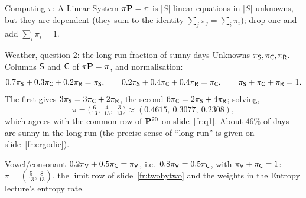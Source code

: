 \begin{frame}{Computing $\pi$: A Linear System}
  \label{fr:statcompute}
  \small
  $\pi\mathbf{P}=\pi$ is $|S|$ linear equations in $|S|$ unknowns, but they are dependent (they sum to the identity $\sum_j\pi_j=\sum_i\pi_i$); drop one and add $\sum_i\pi_i=1$.
  \begin{exampleblock}{Weather, question 2: the long-run fraction of sunny days}
    Unknowns $\pi_{\mathsf{S}},\pi_{\mathsf{C}},\pi_{\mathsf{R}}$. Columns $\mathsf{S}$ and $\mathsf{C}$ of $\pi\mathbf{P}=\pi$, and normalisation:
    \[
      0.7\pi_{\mathsf{S}}+0.3\pi_{\mathsf{C}}+0.2\pi_{\mathsf{R}}=\pi_{\mathsf{S}},\qquad
      0.2\pi_{\mathsf{S}}+0.4\pi_{\mathsf{C}}+0.4\pi_{\mathsf{R}}=\pi_{\mathsf{C}},\qquad
      \pi_{\mathsf{S}}+\pi_{\mathsf{C}}+\pi_{\mathsf{R}}=1 .
    \]
    The first gives $3\pi_{\mathsf{S}}=3\pi_{\mathsf{C}}+2\pi_{\mathsf{R}}$, the second $6\pi_{\mathsf{C}}=2\pi_{\mathsf{S}}+4\pi_{\mathsf{R}}$; solving,
    \[
      \pi=\big(\tfrac6{13},\ \tfrac4{13},\ \tfrac3{13}\big)\approx(0.4615,\ 0.3077,\ 0.2308),
    \]
    which agrees with the common row of $\mathbf{P}^{20}$ on slide~\ref{fr:q1}. About $46\%$ of days are sunny in the long run (the precise sense of ``long run'' is given on slide~\ref{fr:ergodic}).
  \end{exampleblock}
  \begin{exampleblock}{Vowel/consonant}
    $0.2\pi_{\mathsf{V}}+0.5\pi_{\mathsf{C}}=\pi_{\mathsf{V}}$, i.e.\ $0.8\pi_{\mathsf{V}}=0.5\pi_{\mathsf{C}}$, with $\pi_{\mathsf{V}}+\pi_{\mathsf{C}}=1$: $\pi=(\tfrac5{13},\tfrac8{13})$, the limit row of slide~\ref{fr:twobytwo} and the weights in the Entropy lecture's entropy rate.
  \end{exampleblock}
\end{frame}

